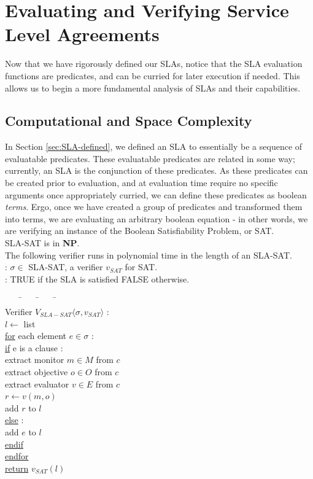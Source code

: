 \documentclass[a4paper,twoside]{article}
\begin{document}
\section{Evaluating and Verifying Service Level Agreements}\label{sec:SLA-analysis}
Now that we have rigorously defined our SLAs, notice that the SLA evaluation functions are predicates, and can be curried for later execution if needed.  This allows us to begin a more fundamental analysis of SLAs and their capabilities.

\subsection{Computational and Space Complexity}
In Section \ref{sec:SLA-defined}, we defined an SLA to essentially be a sequence of evaluatable predicates.  These evaluatable predicates are related in some way; currently, an SLA is the conjunction of these predicates.  As these predicates can be created prior to evaluation, and at evaluation time require no specific arguments once appropriately curried, we can define these predicates as boolean {\it terms}.  Ergo, once we have created a group of predicates and transformed them into terms, we are evaluating an arbitrary boolean equation - in other words, we are verifying an instance of the Boolean Satisfiability Problem, or SAT.\\

 SLA-SAT is in {\bf NP}.\\

 The following verifier runs in polynomial time in the length of an SLA-SAT.\\

: $ \sigma \in $ SLA-SAT, a verifier $v_{SAT}$ for SAT. \\
: TRUE if the SLA is satisfied FALSE otherwise.
\begin{tabbing}
~~~~\=~~~~\=~~~~\=~~~~\= \\
\noindent Verifier $V_{SLA-SAT} \langle \sigma, v_{SAT}  \rangle$ : \\
\> $ l \leftarrow $ list \\
\> \underline{for} each element $ e \in \sigma $ :\\
\>\> \underline{if} e is a clause : \\
\>\>\> extract monitor $ m \in M $ from $ c $\\
\>\>\> extract objective $ o \in O $ from $ c $\\
\>\>\> extract evaluator $ v \in E $ from $ c $\\
\>\>\> $ r \leftarrow v ( m, o ) $\\
\>\>\> add $ r $ to $ l $ \\
\>\> \underline{else} : \\
\>\>\> add $ e $ to $ l $ \\
\>\> \underline{endif} \\
\> \underline{endfor} \\
\> \underline{return} $ v_{SAT}(l) $ \\
\end{tabbing}
\end{document}
